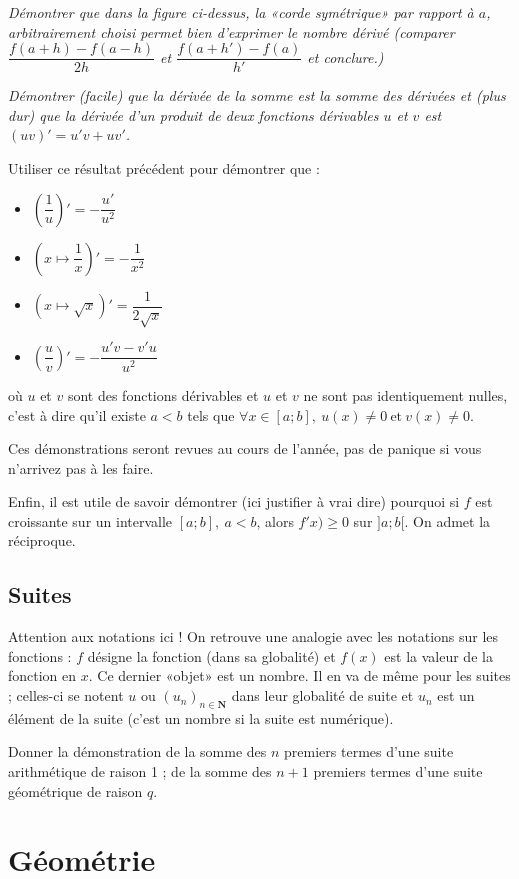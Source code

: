 \documentclass[a4paper,12pt,french]{article}
\newcommand{\N}{\mathbf{N}}
\begin{document}
\emph{Démontrer que dans la figure ci-dessus, la «corde symétrique» par
rapport à $a$, arbitrairement choisi permet bien d'exprimer le nombre
dérivé (comparer $\dfrac{f(a+h) - f(a-h)}{2h}$ et $\dfrac{f(a+h') -
f(a)}{h'}$ et conclure.)}

\emph{Démontrer (facile) que la dérivée de la somme est la somme des dérivées
et (plus dur) que la dérivée d'un produit de deux fonctions dérivables
$u$ et $v$ est $(uv)' = u'v + uv'$.}

Utiliser ce résultat précédent pour démontrer que :
\begin{itemize}
  \item $\left(\dfrac1u\right)' = - \dfrac{u'}{u^2}$
  \item $\left(x\mapsto\dfrac1x\right)' = -\dfrac1{x^2}$
  \item $\left(x\mapsto\sqrt{x}\right)' = \dfrac1{2\sqrt{x}}$
  \item $\left(\dfrac{u}{v}\right)' = -\dfrac{u'v - v'u}{u^2}$
\end{itemize}
où $u$ et $v$ sont des fonctions dérivables et $u$ et $v$ ne sont pas
identiquement nulles, c'est à dire qu'il existe $a<b$ tels que $\forall
x\in[a;b],\ u(x) \neq 0\ \text{et}\ v(x)\neq0$.

Ces démonstrations seront revues au cours de l'année, pas de panique si
vous n'arrivez pas à les faire.

Enfin, il est utile de savoir démontrer (ici justifier à vrai dire)
pourquoi si $f$ est croissante sur un intervalle $[a;b],\ a<b$, alors
$f'x)\geqslant 0$ sur $]a;b[$. On admet la réciproque.

\subsection{Suites}

Attention aux notations ici ! On retrouve une analogie avec les
notations sur les fonctions : $f$ désigne la fonction (dans sa
globalité) et $f(x)$ est la valeur de la fonction en $x$. Ce dernier
«objet» est un nombre. Il en va de même pour les suites ; celles-ci se
notent $u$ ou $(u_n)_{n\in\N}$ dans leur globalité de suite et $u_n$
est un élément de la suite (c'est un nombre si la suite est numérique).

Donner la démonstration de la somme des $n$ premiers termes d'une suite
arithmétique de raison 1 ; de la somme des $n+1$ premiers termes d'une
suite géométrique de raison $q$.

\section{Géométrie}
\end{document}
